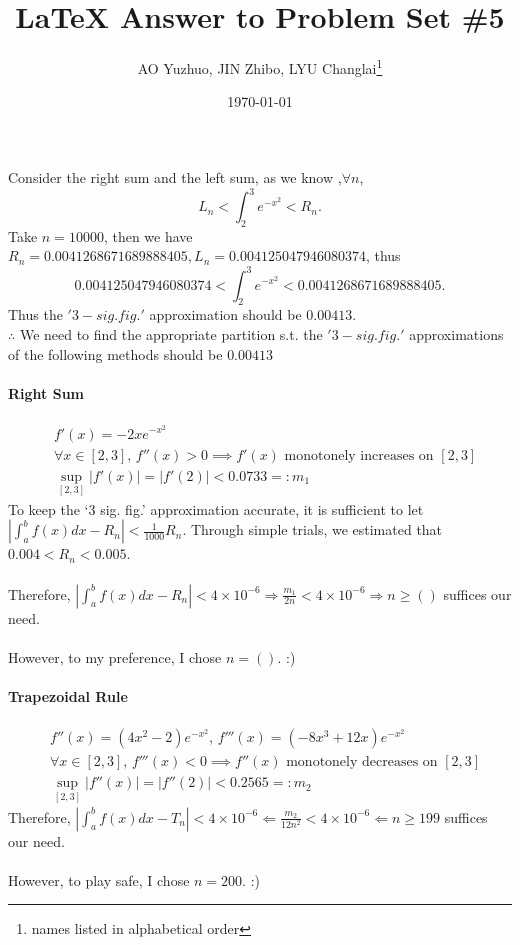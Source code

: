 \documentclass{article}
\title{\LaTeX{} Answer to Problem Set \#5}
\author{AO Yuzhuo, JIN Zhibo, LYU Changlai\thanks{names listed in alphabetical order}}
\date{\today}
\def\imply{\Longrightarrow}
\begin{document}
\maketitle

\section{}
Consider the right sum and the left sum,
as we know ,$\forall n$,
$$L_n<\int_{2}^{3}e^{-x^2}<R_n.$$
Take $n=10000$, then we have $R_n=0.0041268671689888405,L_n=0.004125047946080374$, thus
$$0.004125047946080374<\int_{2}^{3}e^{-x^2}<0.0041268671689888405.$$
Thus the $'3-sig. fig.'$ approximation should be $0.00413$.\\
$\therefore$ We need to find the appropriate partition s.t. the $'3-sig. fig.'$ approximations of the 
following methods should be $0.00413$

\paragraph{Right Sum}
$$\begin{aligned}
    &f'(x) = -2xe^{-x^2} \\
    &\forall x \in [2,3] ,\, f''(x)>0 \implies f'(x) \text{ monotonely increases on } [2,3] \\
    &\sup_{[2,3]} \left|f'(x)\right| = \left|f'(2)\right| < 0.0733 =: m_1
\end{aligned}$$
To keep the ‘3 sig. fig.’ approximation accurate, it is sufficient to let $\left| \int_a^b f(x)dx - R_n \right| < \frac{1}{1000}R_n$.
Through simple trials, we estimated that $0.004<R_n<0.005$.
\\\\
Therefore, $\left| \int_a^b f(x)dx - R_n \right| < 4\times 10^{-6} \imply \frac{m_1}{2n} < 4\times 10^{-6} \imply n \ge (   )$ suffices our need.
\\\\
However, to my preference, I chose $n=(   )$. :)

\paragraph{Trapezoidal Rule}
$$\begin{aligned}
    &f''(x) = (4x^2-2)e^{-x^2} ,\, f'''(x) = (-8x^3+12x)e^{-x^2} \\
    &\forall x \in [2,3] ,\, f'''(x)<0 \implies f''(x) \text{ monotonely decreases on } [2,3] \\
    &\sup_{[2,3]} \left|f''(x)\right| = \left|f''(2)\right| < 0.2565 =: m_2
\end{aligned}$$
Therefore, $\left| \int_a^b f(x)dx - T_n \right| < 4\times 10^{-6} \Longleftarrow \frac{m_2}{12n^2} < 4\times 10^{-6} \Longleftarrow n \ge 199$ suffices our need.
\\\\
However, to play safe, I chose $n=200$. :)
\end{document}
